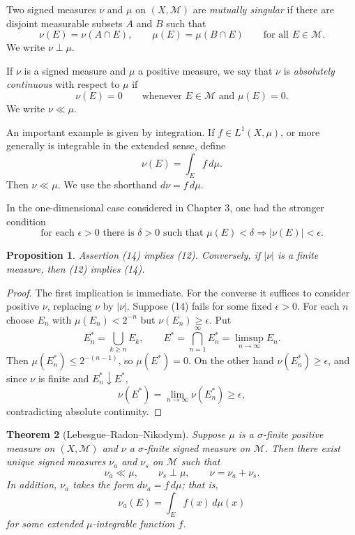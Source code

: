 \documentclass[11pt,openany]{book}
\newtheorem{theorem}{Theorem}[section]
\newtheorem{proposition}[theorem]{Proposition}
\begin{document}
Two signed measures $\nu$ and $\mu$ on $(X,\mathcal M)$ are \emph{mutually singular} if there are disjoint measurable subsets $A$ and $B$ such that
\[
\nu(E)=\nu(A\cap E),
\qquad
\mu(E)=\mu(B\cap E)
\qquad\text{for all }E\in\mathcal M.
\]
We write $\nu\perp\mu$.

If $\nu$ is a signed measure and $\mu$ a positive measure, we say that $\nu$ is \emph{absolutely continuous} with respect to $\mu$ if
\begin{equation}
\nu(E)=0\qquad\text{whenever }E\in\mathcal M\text{ and }\mu(E)=0.
\tag{12}
\end{equation}
We write $\nu\ll\mu$.

An important example is given by integration. If $f\in L^1(X,\mu)$, or more generally is integrable in the extended sense, define
\begin{equation}
\nu(E)=\int_E f\,d\mu.
\tag{13}
\end{equation}
Then $\nu\ll\mu$. We use the shorthand $d\nu=f\,d\mu$.

In the one-dimensional case considered in Chapter 3, one had the stronger condition
\begin{equation}
\text{for each }\epsilon>0\text{ there is }\delta>0\text{ such that }\mu(E)<\delta
\Longrightarrow |\nu(E)|<\epsilon.
\tag{14}
\end{equation}

\begin{proposition}
Assertion (14) implies (12). Conversely, if $|\nu|$ is a finite measure, then (12) implies (14).
\end{proposition}

\begin{proof}
The first implication is immediate. For the converse it suffices to consider positive $\nu$, replacing $\nu$ by $|\nu|$. Suppose (14) fails for some fixed $\epsilon>0$. For each $n$ choose $E_n$ with $\mu(E_n)<2^{-n}$ but $\nu(E_n)\geq\epsilon$. Put
\[
E_n^*=\bigcup_{k\geq n}E_k,
\qquad
E^*=\bigcap_{n=1}^{\infty}E_n^*=\limsup_{n\to\infty}E_n.
\]
Then $\mu(E_n^*)\leq 2^{-(n-1)}$, so $\mu(E^*)=0$. On the other hand $\nu(E_n^*)\geq\epsilon$, and since $\nu$ is finite and $E_n^*\downarrow E^*$,
\[
\nu(E^*)=\lim_{n\to\infty}\nu(E_n^*)\geq\epsilon,
\]
contradicting absolute continuity.
\end{proof}

\begin{theorem}[Lebesgue--Radon--Nikodym]
Suppose $\mu$ is a $\sigma$-finite positive measure on $(X,\mathcal M)$ and $\nu$ a $\sigma$-finite signed measure on $\mathcal M$. Then there exist unique signed measures $\nu_a$ and $\nu_s$ on $\mathcal M$ such that
\[
\nu_a\ll\mu,
\qquad
\nu_s\perp\mu,
\qquad
\nu=\nu_a+\nu_s.
\]
In addition, $\nu_a$ takes the form $d\nu_a=f\,d\mu$; that is,
\[
\nu_a(E)=\int_E f(x)\,d\mu(x)
\]
for some extended $\mu$-integrable function $f$.
\end{theorem}
\end{document}
